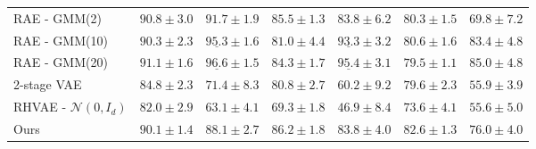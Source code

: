\documentclass[10pt,journal,compsoc]{IEEEtran}
\begin{document}
\begin{table*}[!ht]
\begin{center}
\begin{tabular}{l |c c |c c |c c}
      RAE - GMM(2) & $ 90.8 \pm 3.0 $ & $ 91.7 \pm 1.9 $ & $ 85.5 \pm 1.3 $ & $83.8 \pm 6.2$  & $ 80.3 \pm 1.5 $ & $ 69.8 \pm 7.2 $ \\
      RAE - GMM(10) & $ 90.3 \pm 2.3 $ & $ \underline{95.3} \pm 1.6 $ & $ 81.0 \pm 4.4 $ & $\underline{93.3} \pm 3.2$  & $ 80.6 \pm 1.6 $ & $ 83.4 \pm 4.8 $ \\
      RAE - GMM(20) & $ \boldsymbol{91.1 \pm 1.6}  $ & $ \underline{96.6} \pm 1.5  $ & $ 84.3 \pm 1.7 $ & $\underline{95.4} \pm 3.1 $  & $ 79.5 \pm 1.1 $ & $\boldsymbol{ 85.0 \pm 4.8} $ \\
      2-stage VAE & $84.8 \pm 2.3 $ & $71.4 \pm 8.3$ & $ 80.8 \pm 2.7 $ &  $ 60.2 \pm 9.2 $ & $ 79.6 \pm 2.3$ & $ 55.9 \pm 3.9 $ \\
      RHVAE - $\mathcal{N}(0, I_d)$   & $82.0 \pm 2.9 $ & $ 63.1 \pm 4.1 $  & $ 69.3 \pm 1.8$  & $ 46.9 \pm 8.4  $  & $73.6 \pm 4.1$ & $ 55.6 \pm 5.0$ \\
      \hline
      Ours                            & $90.1 \pm 1.4 $ & $ \boldsymbol{ 88.1 \pm 2.7} $  & $ \boldsymbol{86.2 \pm 1.8}$  & $ \mathbf{ 83.8 \pm 4.0 }  $  & $\boldsymbol{82.6 \pm 1.3}$ & $ 76.0 \pm 4.0$ \\
      \hline
      \end{tabular}
      \end{center}
      \end{table*}
\end{document}
